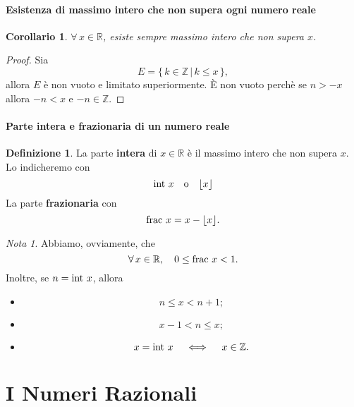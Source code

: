 \documentclass{article}
\theoremstyle{plain}
\newtheorem{cor}{Corollario}
\theoremstyle{definition}
\newtheorem{defn}{Definizione}[section]
\theoremstyle{remark}
\newtheorem{note}{Nota}
\begin{document}
\paragraph{Esistenza di massimo intero che non supera ogni numero reale}
\begin{bxthm}
\begin{cor}
    $\forall\, x\in\mathbb{R}$, esiste sempre massimo intero che non supera $x$.
\end{cor}
\end{bxthm}
\begin{proof}
    Sia \[E=\{\,k\in\mathbb{Z}\,|\,k\leq x\,\},\] allora $E$ è non vuoto e limitato superiormente.
    È non vuoto perchè se $n>-x$ allora $-n<x$ e $-n\in\mathbb{Z}$.
\end{proof}

\vspace{10pt}

\paragraph{Parte intera e frazionaria di un numero reale}
\begin{bxthm}
\begin{defn}
    La parte \textbf{intera} di $x\in\mathbb{R}$ è il massimo intero che non supera $x$.
    Lo indicheremo con \[\textup{int }x\quad\textup{o}\quad\lfloor x\rfloor\]
    La parte \textbf{frazionaria} con \[\textup{frac }x=x-\lfloor x\rfloor.\]
\end{defn}
\end{bxthm}

\vspace{10pt}

\begin{note}
    Abbiamo, ovviamente, che \[\forall\, x\in\mathbb{R},\quad 0\leq \textup{frac }x<1.\]
    Inoltre, se $n=\textup{int }x$, allora 
    \begin{itemize}
        \item \[n\leq x<n+1 ;\]
        \item \[x-1<n\leq x ;\]
        \item \[x=\textup{int }x\quad\iff\quad x\in\mathbb{Z} .\]
    \end{itemize}
\end{note}

\vspace{50pt} 
\section{I Numeri Razionali}
\vspace{50pt} 
\end{document}
